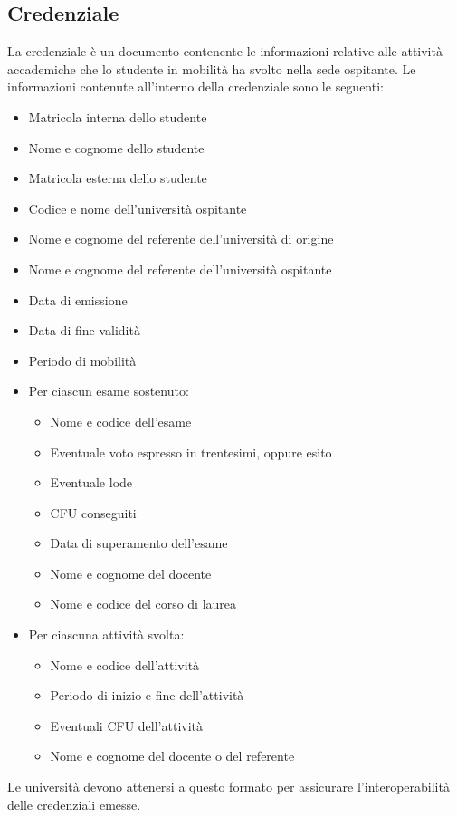 \documentclass[a4paper,12pt]{article}
\begin{document}
\subsection{Credenziale}
La credenziale è un documento contenente le informazioni relative alle attività accademiche che lo studente in mobilità ha svolto nella sede ospitante. 
\newline Le informazioni contenute all'interno della credenziale sono le seguenti:
\begin{itemize}
    \item Matricola interna dello studente
    \item Nome e cognome dello studente
    \item Matricola esterna dello studente
    \item Codice e nome dell'università ospitante
    \item Nome e cognome del referente dell'università di origine
    \item Nome e cognome del referente dell'università ospitante
    \item Data di emissione  
    \item Data di fine validità
    \item Periodo di mobilità
    \item Per ciascun esame sostenuto:
    \begin{itemize}[label=$\circ$]
        \item Nome e codice dell'esame
        \item Eventuale voto espresso in trentesimi, oppure esito
        \item Eventuale lode
        \item CFU conseguiti
        \item Data di superamento dell'esame
        \item Nome e cognome del docente
        \item Nome e codice del corso di laurea
    \end{itemize}
    \item Per ciascuna attività svolta:
    \begin{itemize}[label=$\circ$]
        \item Nome e codice dell'attività
        \item Periodo di inizio e fine dell'attività
        \item Eventuali CFU dell'attività
        \item Nome e cognome del docente o del referente
    \end{itemize}
\end{itemize}
Le università devono attenersi a questo formato per assicurare l'interoperabilità delle credenziali emesse.
\end{document}
